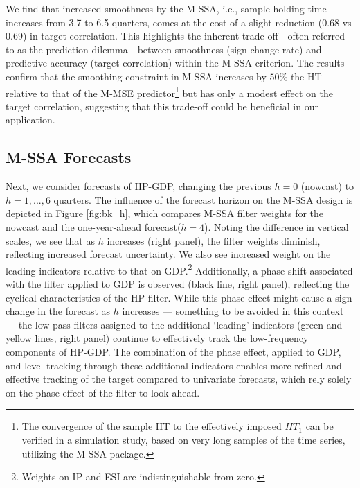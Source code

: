 \documentclass[11pt,a4paper]{article}
\begin{document}
We find that increased smoothness by the M-SSA, i.e., sample holding time increases from 3.7 to 6.5 quarters, comes at the cost of a slight reduction (0.68 vs 0.69) in target correlation. This highlights the inherent trade-off—often referred to as the prediction dilemma—between smoothness (sign change rate) and predictive accuracy (target correlation) within the M-SSA criterion. 
The results confirm that the smoothing constraint in M-SSA 
increases by $50\%$ the HT relative to that of the M-MSE predictor\footnote{The convergence of the sample HT to the effectively imposed $HT_1$ can be verified in a simulation study, based on very long samples of the time series, utilizing the M-SSA package.} but has only a modest effect on the target correlation, suggesting that this trade-off could be beneficial in our application.


\subsection{M-SSA Forecasts}

Next, we consider forecasts of HP-GDP, changing the previous 
$h=0$ (nowcast) to $h=1,...,6$ quarters. 
The influence of the forecast horizon on the M-SSA design is depicted in Figure \ref{fig:bk_h}, which compares M-SSA filter weights for the nowcast and the one-year-ahead forecast($h=4$). Noting the difference in vertical scales, we see that as $h$ increases (right panel), the filter weights diminish, reflecting increased forecast uncertainty. We also see increased weight on the leading indicators relative to that on GDP.\footnote{Weights on IP and ESI are indistinguishable from zero.} Additionally, a phase shift associated with the filter applied to GDP is observed (black line, right panel), reflecting the cyclical characteristics of the HP filter. While this phase effect might cause a sign change in the forecast as $h$ increases — something to be avoided in this context — the low-pass filters assigned to the additional `leading' indicators (green and yellow lines, right panel) continue to effectively track the low-frequency components of HP-GDP. The combination of the phase effect, applied to GDP, and level-tracking through these additional indicators enables more refined and effective tracking of the target compared to univariate forecasts, which rely solely on the phase effect of the filter to look ahead.
\end{document}
